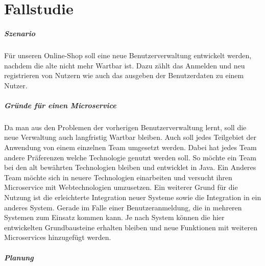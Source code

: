 \chapter{Fallstudie}\label{ch:Fallstudie}
\paragraph{Szenario}
Für unseren Online-Shop soll eine neue Benutzerverwaltung entwickelt werden, nachdem die alte nicht mehr Wartbar ist. Dazu zählt das Anmelden und neu registrieren von Nutzern wie auch das ausgeben der Benutzerdaten zu einem Nutzer.

\paragraph{Gründe für einen Microservice}
Da man aus den Problemen der vorherigen Benutzerverwaltung lernt, soll die neue Verwaltung auch langfristig Wartbar bleiben. \newline
Auch soll jedes Teilgebiet der Anwendung von einem einzelnen Team umgesetzt werden. Dabei hat jedes Team andere Präferenzen welche Technologie genutzt werden soll. So möchte ein Team bei den alt bewährten Technologien bleiben und entwicklet in Java. Ein Anderes Team möchte sich in neuere Technologien einarbeiten und versucht ihren Microservice mit Webtechnologien umzusetzen. \newline
Ein weiterer Grund für die Nutzung ist die erleichterte Integration neuer Systeme sowie die Integration in ein anderes System. Gerade im Falle einer Benutzeranmeldung, die in mehreren Systemen zum Einsatz kommen kann. Je nach System können die hier entwickelten Grundbausteine erhalten bleiben und neue Funktionen mit weiteren Microservices hinzugefügt werden.

\paragraph{Planung}

